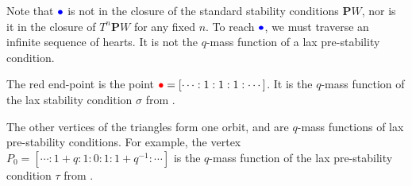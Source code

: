 \documentclass{amsart}
\begin{document}
Note that \(\textcolor{blue}{\bullet}\) is not in the closure of the standard stability conditions \(\mathbf{P}W\), nor is it in the closure of \(T^n \mathbf{P}W\) for any fixed \(n\).
To reach \(\textcolor{blue}{\bullet}\), we must traverse an infinite sequence of hearts.
It is not the \(q\)-mass function of a lax pre-stability condition.

The red end-point is the point \(\textcolor{red}{\bullet} = [\cdots : 1 : 1 : 1 : \cdots]\).
It is the \(q\)-mass function of the lax stability condition \(\sigma\) from .

The other vertices of the triangles form one orbit, and are \(q\)-mass functions of lax pre-stability conditions.
For example, the vertex \(P_0 = [ \cdots: 1+q : 1 : 0 : 1 : 1+q^{-1} : \cdots ]\) is the \(q\)-mass function of the lax pre-stability condition \(\tau\) from .




\end{document}
